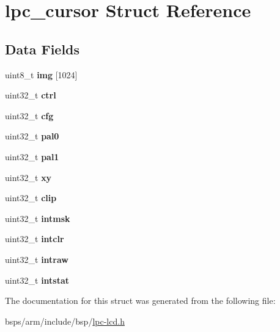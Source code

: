 \hypertarget{structlpc__cursor}{}\section{lpc\+\_\+cursor Struct Reference}
\label{structlpc__cursor}
\subsection*{Data Fields}
\begin{DoxyCompactItemize}
\item 
\mbox{\label{structlpc__cursor_aa18a990c740086ecf61301bf4587b526}} 
uint8\+\_\+t {\bfseries img} \mbox{[}1024\mbox{]}
\item 
\mbox{\label{structlpc__cursor_a0b9321ae8e6e6440d2a9f3e89e28f992}} 
uint32\+\_\+t {\bfseries ctrl}
\item 
\mbox{\label{structlpc__cursor_aa56072c8e4eda36d2982555922278ff8}} 
uint32\+\_\+t {\bfseries cfg}
\item 
\mbox{\label{structlpc__cursor_a0fe38ce2e3861f5345234ff049b4c7d4}} 
uint32\+\_\+t {\bfseries pal0}
\item 
\mbox{\label{structlpc__cursor_a026e9a46cd44b07f8fe9320a166bdf99}} 
uint32\+\_\+t {\bfseries pal1}
\item 
\mbox{\label{structlpc__cursor_ad2c6e4cec773d181e9032646fe36dd1f}} 
uint32\+\_\+t {\bfseries xy}
\item 
\mbox{\label{structlpc__cursor_ac33a82f5651425de1d2cf6c1acb038e3}} 
uint32\+\_\+t {\bfseries clip}
\item 
\mbox{\label{structlpc__cursor_ac2e7834e17a8e87df000246fb62f826a}} 
uint32\+\_\+t {\bfseries intmsk}
\item 
\mbox{\label{structlpc__cursor_adda032775771b2fa380ef7ba868e92db}} 
uint32\+\_\+t {\bfseries intclr}
\item 
\mbox{\label{structlpc__cursor_a23a3076d5906b01a4a967ce46ce7cce0}} 
uint32\+\_\+t {\bfseries intraw}
\item 
\mbox{\label{structlpc__cursor_a27ff4797ace40144362ef7147dc6f468}} 
uint32\+\_\+t {\bfseries intstat}
\end{DoxyCompactItemize}


The documentation for this struct was generated from the following file\+:\begin{DoxyCompactItemize}
\item 
bsps/arm/include/bsp/\mbox{\hyperlink{lpc-lcd_8h}{lpc-\/lcd.\+h}}\end{DoxyCompactItemize}
